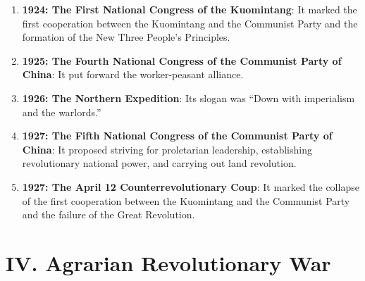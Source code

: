 \documentclass[12pt,a4paper]{ctexart}
\begin{document}
\begin{enumerate}[leftmargin=2em]
    \item \textbf{1924: The First National Congress of the Kuomintang}: It marked the first cooperation between the Kuomintang and the Communist Party and the formation of the New Three People's Principles.
    \item \textbf{1925: The Fourth National Congress of the Communist Party of China}: It put forward the worker-peasant alliance.
    \item \textbf{1926: The Northern Expedition}: Its slogan was ``Down with imperialism and the warlords.''
    \item \textbf{1927: The Fifth National Congress of the Communist Party of China}: It proposed striving for proletarian leadership, establishing revolutionary national power, and carrying out land revolution.
    \item \textbf{1927: The April 12 Counterrevolutionary Coup}: It marked the collapse of the first cooperation between the Kuomintang and the Communist Party and the failure of the Great Revolution.
\end{enumerate}

\section{IV. Agrarian Revolutionary War}
\end{document}
